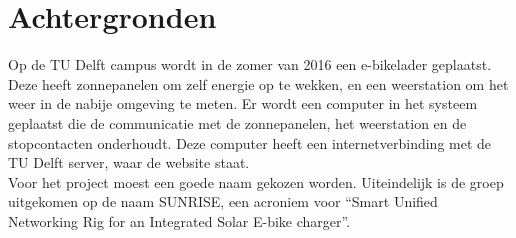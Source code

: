 \section{Achtergronden}


Op de TU Delft campus wordt in de zomer van 2016 een e-bikelader geplaatst. Deze heeft zonnepanelen om zelf energie op te wekken, en een weerstation om het weer in de nabije omgeving te meten. Er wordt een computer in het systeem geplaatst die de communicatie met de zonnepanelen, het weerstation en de stopcontacten onderhoudt. Deze computer heeft een internetverbinding met de TU Delft server, waar de website staat.\\

Voor het project moest een goede naam gekozen worden. Uiteindelijk is de groep uitgekomen op de naam SUNRISE, een acroniem voor ``Smart Unified Networking Rig for an Integrated Solar E-bike charger''.

